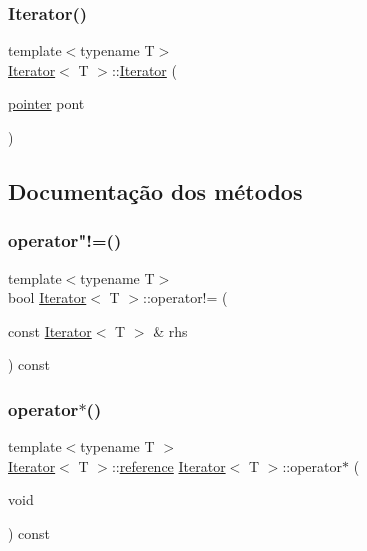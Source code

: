 \mbox{\label{classIterator_ab1fb88dce7c959a7d56537deb77ee717}} 
\subsubsection{\texorpdfstring{Iterator()}{Iterator()}\hspace{0.1cm}{\footnotesize\ttfamily [2/2]}}
{\footnotesize\ttfamily template$<$typename T$>$ \\
\hyperlink{classIterator}{Iterator}$<$ T $>$\+::\hyperlink{classIterator}{Iterator} (\begin{DoxyParamCaption}\item[{\hyperlink{classIterator_a37c4732ae0b73e9fdc3a585c01750d05}{pointer}}]{pont }\end{DoxyParamCaption})}



\subsection{Documentação dos métodos}
\mbox{\label{classIterator_a32c6a5534138f799579a06a39a70f456}} 
\subsubsection{\texorpdfstring{operator"!=()}{operator!=()}}
{\footnotesize\ttfamily template$<$typename T$>$ \\
bool \hyperlink{classIterator}{Iterator}$<$ T $>$\+::operator!= (\begin{DoxyParamCaption}\item[{const \hyperlink{classIterator}{Iterator}$<$ T $>$ \&}]{rhs }\end{DoxyParamCaption}) const}

\mbox{\label{classIterator_a337d71a2dce5d35218a5a5d92746cf4f}} 
\subsubsection{\texorpdfstring{operator$\ast$()}{operator*()}}
{\footnotesize\ttfamily template$<$typename T $>$ \\
\hyperlink{classIterator}{Iterator}$<$ T $>$\+::\hyperlink{classIterator_a104c7f213cd33d599aa25277176529d5}{reference} \hyperlink{classIterator}{Iterator}$<$ T $>$\+::operator$\ast$ (\begin{DoxyParamCaption}\item[{void}]{ }\end{DoxyParamCaption}) const}

